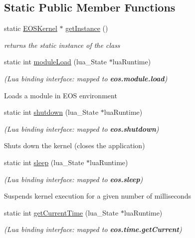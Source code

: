 \subsection*{Static Public Member Functions}
\begin{CompactItemize}
\item 
static \hyperlink{structEOSKernel}{EOSKernel} $\ast$ \hyperlink{structEOSKernel_b18f0db248717d197b3f0963265bf541}{getInstance} ()
\begin{CompactList}\small\item\em returns the static instance of the class \item\end{CompactList}\item 
static int \hyperlink{structEOSKernel_ed482eda9801f20453fdca40d91e7512}{moduleLoad} (lua\_\-State $\ast$luaRuntime)
\begin{CompactList}\small\item\em {\em (Lua binding interface: mapped to {\bf eos.module.load})\/}\par
\par
 Loads a module in EOS environment \item\end{CompactList}\item 
static int \hyperlink{structEOSKernel_5818cdf156babf931c7203339d6ee8ac}{shutdown} (lua\_\-State $\ast$luaRuntime)
\begin{CompactList}\small\item\em {\em (Lua binding interface: mapped to {\bf eos.shutdown})\/}\par
\par
 Shuts down the kernel (closes the application) \item\end{CompactList}\item 
static int \hyperlink{structEOSKernel_b1d4a0583d293c85eaec6d645aa073de}{sleep} (lua\_\-State $\ast$luaRuntime)
\begin{CompactList}\small\item\em {\em (Lua binding interface: mapped to {\bf eos.sleep})\/}\par
\par
 Suspends kernel execution for a given number of milliseconds \item\end{CompactList}\item 
static int \hyperlink{structEOSKernel_8b244f5fbf545937dccaa2cb01720f33}{getCurrentTime} (lua\_\-State $\ast$luaRuntime)
\begin{CompactList}\small\item\em {\em (Lua binding interface: mapped to {\bf eos.time.getCurrent})\/}\par

\end{CompactList}
\end{CompactItemize}
